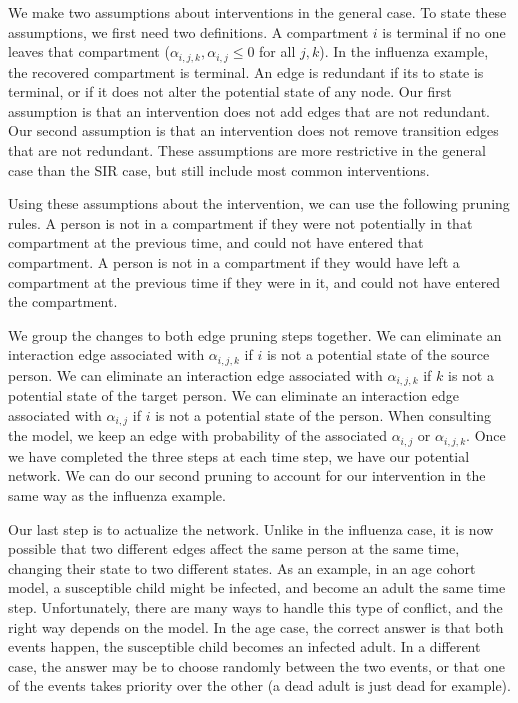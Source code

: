 \documentclass[PTRSB]{rsos}
\begin{document}
\begin{multicols}{2}
We make two assumptions about interventions in the general case.
To state these assumptions, we first need two definitions.
A compartment $i$ is terminal if no one leaves that compartment ($\alpha_{i,j,k},\alpha_{i,j} \leq 0$ for all $j,k$).
In the influenza example, the recovered compartment is terminal.
An edge is redundant if its to state is terminal, or if it does not alter the potential state of any node.
Our first assumption is that an intervention does not add edges that are not redundant.
Our second assumption is that an intervention does not remove transition edges that are not redundant.
These assumptions are more restrictive in the general case than the SIR case, but still include most common interventions.

Using these assumptions about the intervention, we can use the following pruning rules.
A person is not in a compartment if they were not potentially in that compartment at the previous time, and could not have entered that compartment.
A person is not in a compartment if they would have left a compartment at the previous time if they were in it, and could not have entered the compartment.

We group the changes to both edge pruning steps together.
We can eliminate an interaction edge associated with $\alpha_{i,j,k}$ if $i$ is not a potential state of the source person.
We can eliminate an interaction edge associated with $\alpha_{i,j,k}$ if $k$ is not a potential state of the target person.
We can eliminate an interaction edge associated with $\alpha_{i,j}$ if $i$ is not a potential state of the person.
When consulting the model, we keep an edge with probability of the associated $\alpha_{i,j}$ or $\alpha_{i,j,k}$.
Once we have completed the three steps at each time step, we have our potential network.
We can do our second pruning to account for our intervention in the same way as the influenza example.

Our last step is to actualize the network.
Unlike in the influenza case, it is now possible that two different edges affect the same person at the same time, changing their state to two different states.
As an example, in an age cohort model, a susceptible child might be infected, and become an adult the same time step.
Unfortunately, there are many ways to handle this type of conflict, and the right way depends on the model.
In the age case, the correct answer is that both events happen, the susceptible child becomes an infected adult.
In a different case, the answer may be to choose randomly between the two events, or that one of the events takes priority over the other (a dead adult is just dead for example).


\end{multicols}
\end{document}
